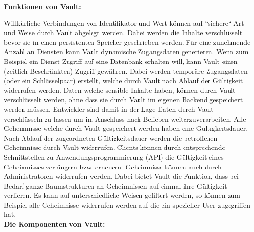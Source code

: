 \documentclass[
book,
a4paper,   
titlepage,  
halfparskip,
12pt        
]{scrartcl}
\begin{document}
\begin{onehalfspacing}
\textbf{Funktionen von Vault:}

Willkürliche Verbindungen von Identifikator und Wert können auf ``sichere`` Art und Weise durch Vault abgelegt werden. Dabei werden die Inhalte verschlüsselt bevor sie in einen persistenten Speicher geschrieben werden.
Für eine zunehmende Anzahl an Diensten kann Vault dynamische Zugangsdaten generieren. Wenn zum Beispiel ein Dienst Zugriff auf eine Datenbank erhalten will, kann Vault einen (zeitlich Beschränkten) Zugriff gewähren. Dabei werden temporäre Zugangsdaten (oder ein Schlüsselpaar) erstellt, welche durch Vault nach Ablauf der Gültigkeit widerrufen werden.
Daten welche sensible Inhalte haben, können durch Vault verschlüsselt werden, ohne dass sie durch Vault im eigenen Backend gespeichert werden müssen. Entwickler sind damit in der Lage Daten durch Vault verschlüsseln zu lassen um im Anschluss nach Belieben weiterzuverarbeiten.\newline
Alle Geheimnisse welche durch Vault gespeichert werden haben eine Gültigkeitsdauer. Nach Ablauf der zugeordneten Gültigkeitsdauer werden die betroffenen Geheimnisse durch Vault widerrufen. Clients können durch entsprechende Schnittstellen zu Anwendungsprogrammierung (API) die Gültigkeit eines Geheimnisses verlängern bzw. erneuern.
Geheimnisse können auch durch Administratoren widerrufen werden. Dabei bietet Vault die Funktion, dass bei Bedarf ganze Baumstrukturen an Geheimnissen auf einmal ihre Gültigkeit verlieren. Es kann auf unterschiedliche Weisen gefiltert werden, so können zum Beispiel alle Geheimnisse widerrufen werden auf die ein spezieller User zugegriffen hat.\\

\textbf{Die Komponenten von Vault:}


\end{onehalfspacing}
\end{document}
